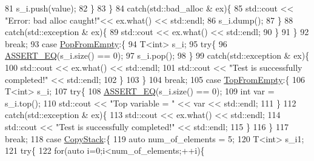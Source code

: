\begin{DoxyCode}
81                         s\_i.push(value);
82                     \}
83                 \}
84                 \textcolor{keywordflow}{catch}(std::bad\_alloc & ex)\{
85                     std::cout << \textcolor{stringliteral}{"Error: bad alloc caught!"}<< ex.what() << std::endl;
86                     s\_i.dump(); 
87                 \}
88                 \textcolor{keywordflow}{catch}(std::exception & ex)\{
89                     std::cout << ex.what() << std::endl;
90                 \}
91                                 \}
92                 \textcolor{keywordflow}{break};
93             \textcolor{keywordflow}{case} \hyperlink{namespacestk__test_aee7ec7a767abf7b0b65ce9a2afb7de78ae9c603d2f7d582fd4fdd5db8140ceecf}{PopFromEmpty}:\{
94                 T<int> s\_i;
95                 \textcolor{keywordflow}{try}\{
96                     \hyperlink{main__file_8cpp_a12d9e096a8640ee0477e1cb3505c21b3}{ASSERT\_EQ}(s\_i.size() == 0);
97                     s\_i.pop();
98                 \}
99                 \textcolor{keywordflow}{catch}(std::exception & ex)\{
100                     std::cout << ex.what() << std::endl;
101                     std::cout << \textcolor{stringliteral}{"Test is successfully completed!"} << std::endl;
102                 \}
103                               \}
104                 \textcolor{keywordflow}{break};
105             \textcolor{keywordflow}{case} \hyperlink{namespacestk__test_aee7ec7a767abf7b0b65ce9a2afb7de78acd574f7057fc049aa4da1da5f4b7fd3a}{TopFromEmpty}:\{
106                 T<int> s\_i;
107                 \textcolor{keywordflow}{try}\{
108                     \hyperlink{main__file_8cpp_a12d9e096a8640ee0477e1cb3505c21b3}{ASSERT\_EQ}(s\_i.size() == 0);
109                     \textcolor{keywordtype}{int} var = s\_i.top();
110                     std::cout << \textcolor{stringliteral}{"Top variable = "} << var << std::endl;
111                 \}
112                 \textcolor{keywordflow}{catch}(std::exception & ex)\{
113                     std::cout << ex.what() << std::endl;
114                     std::cout << \textcolor{stringliteral}{"Test is successfully completed!"} << std::endl;
115                 \}
116                               \}
117                 \textcolor{keywordflow}{break};
118             \textcolor{keywordflow}{case} \hyperlink{namespacestk__test_aee7ec7a767abf7b0b65ce9a2afb7de78aef89859ac32f020e99414e3d3e559713}{CopyStack}:\{
119                 \textcolor{keyword}{auto} num\_of\_elements = 5;
120                 T<int> s\_i1;
121                 \textcolor{keywordflow}{try}\{
122                     \textcolor{keywordflow}{for}(\textcolor{keyword}{auto} i=0;i<num\_of\_elements;++i)\{

\end{DoxyCode}

